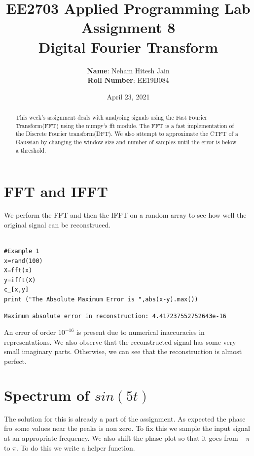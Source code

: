 \documentclass{article}
\title{EE2703 Applied Programming Lab \\   Assignment 8 \\  Digital Fourier Transform}
\author{
  \textbf{Name}: Neham Hitesh Jain\\
  \textbf{Roll Number}: EE19B084
}\date{April 23, 2021}
\begin{document}
\maketitle
\newpage

\begin{abstract}
    This week’s assignment deals with analysing signals using the Fast Fourier
    Transform(FFT) using the numpy’s fft module. The FFT is a fast implementation of 
    the Discrete Fourier transform(DFT). We also attempt to approximate the CTFT 
    of a Gaussian by changing the window size and number of samples until 
    the error is below a threshold.    

\end{abstract}

\section*{FFT and IFFT}\label{fft-and-ifft}

We perform the FFT and then the IFFT on a random array to see how well
the original signal can be reconstruced.

\begin{lstlisting}

#Example 1
x=rand(100)
X=fft(x)
y=ifft(X)
c_[x,y]
print ("The Absolute Maximum Error is ",abs(x-y).max())

\end{lstlisting}

\begin{verbatim}
Maximum absolute error in reconstruction: 4.417237552752643e-16    
\end{verbatim}

An error of order \(10^{-16}\) is present due to numerical inaccuracies
in representations. We also observe that the reconstructed signal has
some very small imaginary parts. Otherwise, we can see that the
reconstruction is almost perfect.



\section*{Spectrum of $sin(5t)$}
The solution for this is already a part of the assignment. 
As expected the phase fro some values near the peaks is non zero. 
To fix this we sample the input signal at an appropriate frequency. 
We also shift the phase plot so that it goes from $-\pi$ to $\pi$. 
To do this we write a helper function.  \\
\end{document}

